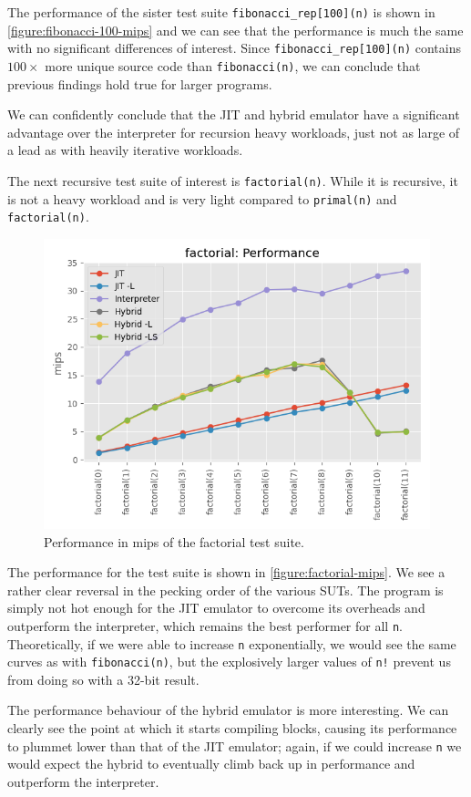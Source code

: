 The performance of the sister test suite \texttt{fibonacci\_rep[100](n)} is shown in \autoref{figure:fibonacci-100-mips} and we can see that the performance is much the same with no significant differences of interest. Since \texttt{fibonacci\_rep[100](n)} contains $100\times$ more unique source code than \texttt{fibonacci(n)}, we can conclude that previous findings hold true for larger programs.

We can confidently conclude that the JIT and hybrid emulator have a significant advantage over the interpreter for recursion heavy workloads, just not as large of a lead as with heavily iterative workloads.

The next recursive test suite of interest is \texttt{factorial(n)}. While it is recursive, it is not a heavy workload and is very light compared to \texttt{primal(n)} and \texttt{factorial(n)}.

\begin{figure}[H]
    \centering
    \includegraphics[scale=0.75]{output/graphs/tests/all/factorial/mips.png}
    \caption{Performance in mips of the factorial test suite.}
    \label{figure:factorial-mips}
\end{figure}

The performance for the test suite is shown in \autoref{figure:factorial-mips}. We see a rather clear reversal in the pecking order of the various SUTs. The program is simply not hot enough for the JIT emulator to overcome its overheads and outperform the interpreter, which remains the best performer for all \texttt{n}. Theoretically, if we were able to increase \texttt{n} exponentially, we would see the same curves as with \texttt{fibonacci(n)}, but the explosively larger values of \texttt{n!} prevent us from doing so with a 32-bit result.

The performance behaviour of the hybrid emulator is more interesting. We can clearly see the point at which it starts compiling blocks, causing its performance to plummet lower than that of the JIT emulator; again, if we could increase \texttt{n} we would expect the hybrid to eventually climb back up in performance and outperform the interpreter.